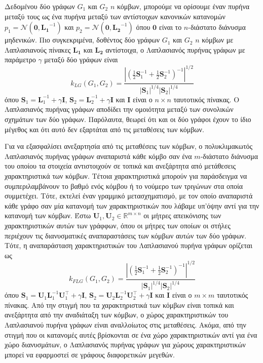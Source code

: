 Δεδομένου δύο γράφων $G_1$ και $G_2$ $n$ κόμβων, μπορούμε να ορίσουμε έναν πυρήνα μεταξύ τους ως ένα πυρήνα μεταξύ των αντίστοιχων κανονικών κατανομών $p_1 = \mathcal{N}(\mathbf{0}, \mathbf{L_1}^{-1})$ και $p_2 = \mathcal{N}(\mathbf{0}, \mathbf{L_2}^{-1})$ όπου $\mathbf{0}$ είναι το $n$-διάστατο διάνυσμα μηδενικών.
Πιο συγκεκριμένα, δοθέντος δύο γράφων $G_1$ και $G_2$ $n$ κόμβων με Λαπλασιανούς πίνακες $\mathbf{L_1}$ και $\mathbf{L_2}$ αντίστοιχα, ο Λαπλασιανός πυρήνας γράφων με παράμετρο $\gamma$ μεταξύ δύο γράφων είναι
\begin{equation*}
    k_{LG}(G_1, G_2) = \frac{| (\frac{1}{2} \mathbf{S}_1^{-1} + \frac{1}{2} \mathbf{S}_2^{-1} )^{-1} |^{1/2}}{|\mathbf{S}_1|^{1/4} |\mathbf{S}_2|^{1/4}} 
\end{equation*}όπου $\mathbf{S}_1 = \mathbf{L}_1^{-1} + \gamma \mathbf{I}$, $\mathbf{S}_2 = \mathbf{L}_2^{-1} + \gamma \mathbf{I}$ και
$\mathbf{I}$ είναι ο $n \times n$ ταυτοτικός πίνακας.
Ο Λαπλασιανός πυρήνας γράφων αποδίδει την ομοιότητα μεταξύ των συνολικών σχημάτων των δύο γράφων.
Παρόλαυτα, θεωρεί ότι και οι δύο γράφοι έχουν το ίδιο μέγεθος και ότι αυτό δεν εξαρτάται από τις μεταθέσεις των κόμβων.

Για να εξασφαλίσει ανεξαρτησία από τις μεταθέσεις των κόμβων, ο πολυκλιμακωτός Λαπλασιανός πυρήνας γράφων αναπαριστά κάθε κόμβο σαν ένα $m$-διάστατο διάνυσμα του οποίου τα στοιχεία αντιστοιχούν σε τοπικά και ανεξάρτητα από μετάθεσεις χαρακτηριστικά των κόμβων.
Τέτοια χαρακτηριστικά μπορούν για παράσδειγμα να συμπεριλαμβάνουν το βαθμό ενός κόμβου ή το νούμερο των τριγώνων στα οποία συμμετέχει.
Τότε, εκτελεί έναν γραμμικό μετασχηματισμό, με τον οποίο αναπαριστά κάθε γράφο σαν μία κατανομή των χαρακτηριστικών που λάβαμε υπ'όψην αντί για την κατανομή των κόμβων.
Έστω $\mathbf{U}_1, \mathbf{U}_2 \in \mathbb{R}^{m \times n}$ οι μήτρες απεικόνισης των χαρακτηριστικών αυτών των γράφφων, όπου οι μήτρες των οποίων οι στήλες περιέχουν τις διανυσματικές αναπαραστάσεις των κόμβων αυτών των δύο γράφων. 
Τότε, η αναπαράσταση χαρακτηριστικών του Λαπλασιανού πυρήνα γράφων ορίζεται ως
\begin{equation*}
    k_{FLG}(G_1, G_2) = \frac{| (\frac{1}{2} \mathbf{S}_1^{-1} + \frac{1}{2} \mathbf{S}_2^{-1} )^{-1} |^{1/2}}{|\mathbf{S}_1|^{1/4} |\mathbf{S}_2|^{1/4}} 
\end{equation*}
όπου $\mathbf{S}_1 = \mathbf{U}_1 \mathbf{L}_1^{-1} \mathbf{U}_1^\top + \gamma \mathbf{I}$, $\mathbf{S}_2 = \mathbf{U}_2 \mathbf{L}_2^{-1} \mathbf{U}_2^\top + \gamma \mathbf{I}$ και $\mathbf{I}$ είναι ο $m \times m$ ταυτοτικός πίνακας.
Από την στιγμή που τα χαρακτηριστικά των κόμβων είναι τοπικά και ανεξάρτητα από την αναδιάταξη των κόμβων, ο χώρος χαρακτηριστικών του Λαπλασιανού πυρήνα γράφων είναι αναλλοίωτος στις μεταθέσεις.
Ακόμα, από την στιγμή που οι κατανομές αυτές βρίσκονται σε ένα χώρο χαρακτηριστικών αντί για ένα χώρο διανυσμάτων, ο Λαπλασιανός πυρήνας γράφων για χώρους χαρακτηριστικών μπορεί να εφαρμοστεί σε γράφους διαφορετικών μεγεθών.

